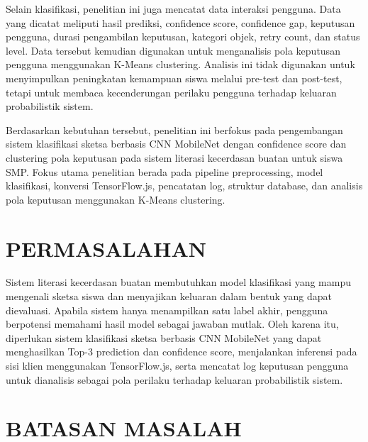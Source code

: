 \documentclass[12pt,oneside]{report}
\begin{document}
Selain klasifikasi, penelitian ini juga mencatat data interaksi pengguna. Data yang dicatat meliputi hasil prediksi, confidence score, confidence gap, keputusan pengguna, durasi pengambilan keputusan, kategori objek, retry count, dan status level. Data tersebut kemudian digunakan untuk menganalisis pola keputusan pengguna menggunakan K-Means clustering. Analisis ini tidak digunakan untuk menyimpulkan peningkatan kemampuan siswa melalui pre-test dan post-test, tetapi untuk membaca kecenderungan perilaku pengguna terhadap keluaran probabilistik sistem.

Berdasarkan kebutuhan tersebut, penelitian ini berfokus pada pengembangan sistem klasifikasi sketsa berbasis CNN MobileNet dengan confidence score dan clustering pola keputusan pada sistem literasi kecerdasan buatan untuk siswa SMP. Fokus utama penelitian berada pada pipeline preprocessing, model klasifikasi, konversi TensorFlow.js, pencatatan log, struktur database, dan analisis pola keputusan menggunakan K-Means clustering.

\section{PERMASALAHAN}
\label{sec:permasalahan}

Sistem literasi kecerdasan buatan membutuhkan model klasifikasi yang mampu mengenali sketsa siswa dan menyajikan keluaran dalam bentuk yang dapat dievaluasi. Apabila sistem hanya menampilkan satu label akhir, pengguna berpotensi memahami hasil model sebagai jawaban mutlak. Oleh karena itu, diperlukan sistem klasifikasi sketsa berbasis CNN MobileNet yang dapat menghasilkan Top-3 prediction dan confidence score, menjalankan inferensi pada sisi klien menggunakan TensorFlow.js, serta mencatat log keputusan pengguna untuk dianalisis sebagai pola perilaku terhadap keluaran probabilistik sistem.

\section{BATASAN MASALAH}
\label{sec:batasan-masalah}
\end{document}

